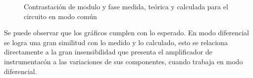 \begin{figure}[H]
    \centering
{}
\caption{Contrastaci\'on de modulo y fase medida, te\'orica y calculada para el circuito en modo com\'un}
\label{fig:RES_COM}
\end{figure}
Se puede observar que los gr\'aficos cumplen con lo esperado. En modo diferencial se logra una gran similitud con lo medido y lo calculado, esto se relaciona directamente a la gran insensibilidad que presenta el amplificador de instrumentac\'on a las variaciones de sus componentes, cuando trabaja en modo diferencial. 
